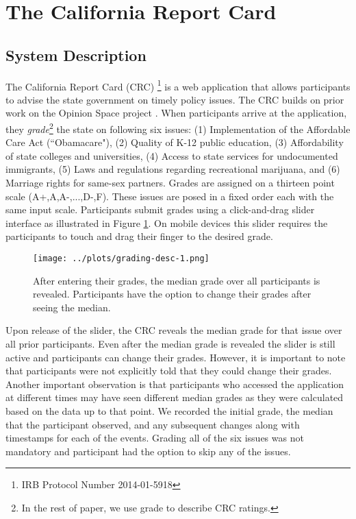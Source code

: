 \section{The California Report Card}
\subsection{System Description}
The California Report Card (CRC) \footnote{IRB Protocol Number 2014-01-5918} is a web application that allows participants to advise the state government on timely policy issues.
The CRC builds on prior work on the Opinion Space project \cite{faridani2011using, bitton2009spatial, faridani2010opinion, nathanson2007eigentaste}.
When participants arrive at the application, they \emph{grade}\footnote{In the rest of paper, we use grade to describe CRC ratings.} the state on following six issues: (1) Implementation of the Affordable Care Act (``Obamacare"),
(2) Quality of K-12 public education, (3) Affordability of state colleges and universities, (4) Access to state services for undocumented immigrants, (5) Laws and regulations regarding recreational marijuana, and (6) Marriage rights for same-sex partners.
Grades are assigned on a thirteen point scale (A+,A,A-,...,D-,F).
These issues are posed in a fixed order each with the same input scale.
Participants submit grades using a click-and-drag slider interface as illustrated in Figure \ref{grading-1}.
On mobile devices this slider requires the participants to touch and drag their finger to the desired grade.

\begin{figure}[h]
  \centering
    \texttt{[image: ../plots/grading-desc-1.png]}
      \caption{After entering their grades, the median grade over all participants is revealed. Participants have the option to change their grades after seeing the median.}
      \label{grading-1}
\end{figure}

Upon release of the slider, the CRC reveals the median grade for that issue over all prior participants.
Even after the median grade is revealed the slider is still active and participants can change their grades.
However, it is important to note that participants were not explicitly told that they could change their grades.
Another important observation is that participants who accessed the application at different times may have seen different median grades as they were calculated based on the data up to that point.
We recorded the initial grade, the median that the participant observed, and any subsequent changes along with timestamps for each of the events. 
Grading all of the six issues was not mandatory and participant had the option to skip any of the issues.

